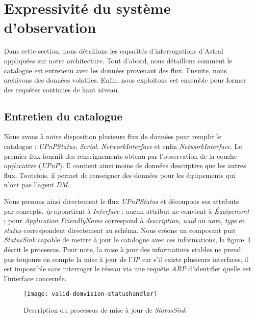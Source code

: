 \section{Expressivité du système d'observation}\label{sec:valid:domvision:requetes}
Dans cette section, nous détaillons les capacités d'interrogations d'Astral appliquées sur notre architecture. Tout d'abord, nous détaillons comment le catalogue est entretenu avec les données provenant des flux. Ensuite, nous archivons des données volatiles. Enfin, nous exploitons cet ensemble pour former des requêtes continues de haut niveau.

\subsection{Entretien du catalogue}
Nous avons à notre disposition plusieurs flux de données pour remplir le catalogue : \textit{UPnPStatus}, \textit{Serial}, \textit{NetworkInterface} et enfin \textit{NetworkInterface}. Le premier flux fournit des renseignements obtenu par l'observation de la couche applicative (\textit{UPnP}). Il contient ainsi moins de données descriptive que les autres flux. Toutefois, il permet de renseigner des données pour les équipements qui n'ont pas l'agent \textit{DM}.

Nous prenons ainsi directement le flux \textit{UPnPStatus} et découpons ses attributs par concepts. \textit{ip} appartient à \textit{Interface} ; aucun attribut ne convient à \textit{Équipement} ; pour \textit{Application} \textit{FriendlyName} correspond à \textit{description}, \textit{uuid} au \textit{nom}, \textit{type} et \textit{status} correspondent directement au schéma. Nous créons un composant puit \textit{StatusSink} capable de mettre à jour le catalogue avec ces informations, la figure~\ref{fig:valid:domvision:statushandler} décrit le processus. Pour note, la mise à jour des informations stables ne prend pas toujours en compte la mise à jour de l'\textit{IP} car s'il existe plusieurs interfaces, il est impossible sans interroger le réseau via une requête \textit{ARP} d'identifier quelle est l'interface concernée.

\begin{figure}[ht]
	\texttt{[image: valid-domvision-statushandler]}
	\caption{Description du processus de mise à jour de \textit{StatusSink}}\label{fig:valid:domvision:statushandler}
\end{figure}

